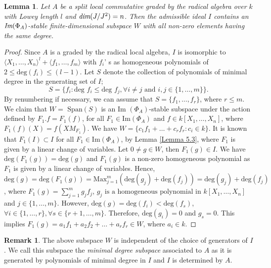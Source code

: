 \documentclass[12pt]{amsart}
\newtheorem{lemma}[theorem]{Lemma}
\theoremstyle{definition}
\newtheorem{remark}[theorem]{Remark}
\numberwithin{equation}{section}
\begin{document}
\vskip2mm
\begin{lemma}\label{Lemma 5.33}
Let $A$ be a split local commutative graded by the radical algebra over $k$ with Lowey length $l$ and $\emph{dim}(J/J^2)=n$. Then the admissible ideal $I$ contains an $\emph{\text{Im}}(\Phi_A)$-stable finite-dimensional subspace $W$ with all non-zero elements having the same degree.
\end{lemma}
\vskip1mm
\begin{proof}
    Since $A$ is a graded by the radical local algebra, $I$ is isomorphic to $\langle X_1,\dots,X_n\rangle^l+\langle f_1,\dots,f_m\rangle$ with $f_i$' s  as homogeneous polynomials of $2\leq \text{deg}(f_i)\leq (l-1)$. Let $S$ denote the collection of polynomials of minimal degree in the generating set of $I$; \[S=\{f_i: \text{deg }f_i\leq \text{deg }f_j, \forall i\neq j \text{ and }i,j\in\{1,\dots,m\}\}.\] By renumbering if necessary, we can assume that $S=\{f_1,\dots,f_r\}$, where $r\leq m$. We claim that $W=\text{ Span}(S)$ is an $\text{Im }(\Phi_A)$-stable subspace under the action defined by $F_1.f=F_1(f)$, for all $F_1\in \text{Im}(\Phi_A)$ and $f\in k[X_1,\dots,X_n]$, where $F_1(f)(X)=f(XM_{F_1})$. We have $W=\{c_1f_1+\dots+c_rf_r:c_i\in k \}$. It is known that $F_1(I)\subset I$ for all $F_1\in \text{Im}(\Phi_A)$, by Lemma \ref{Lemma 5.3}, where $F_1$ is given by a linear change of variables. Let $0\neq g\in W$, then $F_1(g)\in I$. We have $\text{deg}(F_1(g))=\text{deg}(g)$ and $F_{1}(g)$ is a non-zero homogeneous polynomial as $F_1$ is given by a linear change of variables. Hence, $\text{deg}(g)=\text{deg}(F_{1}(g))=\text{Max}_{j=1}^m(\text{deg}(g_j)+\text{deg}(f_j))=\text{deg}(g_j)+\text{deg}(f_j)$, where $F_1(g)=\sum_{j=1}^{m}g_jf_j$, $g_j \text{ is a homogeneous polynomial in } k[X_1,\dots,X_n]$ and  $j\in\{1,\dots,m\}$. However, $\text{deg}(g)=\text{deg}(f_i)<\text{deg}(f_s)$, $\forall i\in \{1,\dots,r\},\forall s\in \{r+1,\dots,m\}$. Therefore, $\text{deg}(g_i)=0$ and $g_s=0$. This implies $F_1(g)=a_1f_1+a_2f_2+\dots+a_rf_r\in W$, where $a_i\in k.$
\end{proof}
\vskip2mm
\begin{remark}\label{Remark 5.34}
    The above subspace $W$ is independent of the choice of generators of $I$. We call this subspace the \emph{minimal degree subspace} associated to $A$ as it is generated by polynomials of minimal degree in $I$ and $I$ is determined by $A$.
\end{remark}
\vskip2mm
\end{document}
